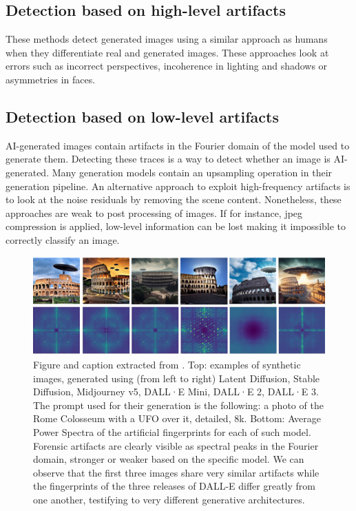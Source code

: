 \documentclass[12pt,a4paper]{article}
\begin{document}
\subsection{Detection based on high-level artifacts}
These methods detect generated images using a similar approach as humans when they differentiate real and generated images. These approaches look at errors such as incorrect perspectives, incoherence in lighting and shadows or asymmetries in faces.

\subsection{Detection based on low-level artifacts}
AI-generated images contain artifacts in the Fourier domain of the model used to generate them. Detecting these traces is a way to detect whether an image is AI-generated. Many generation models contain an upsampling operation in their generation pipeline. An alternative approach to exploit high-frequency artifacts is to look at the noise residuals by removing the scene content. Nonetheless, these approaches are weak to post processing of images. If for instance, jpeg compression is applied, low-level information can be lost making it impossible to correctly classify an image.
\begin{figure}[H]
    \includegraphics[width=\textwidth]{img/peaks.png}
    \caption{Figure and caption extracted from \autocite*{tariangSyntheticImageVerification2024}. Top: examples of synthetic images, generated using (from left to right) Latent Diffusion, Stable Diffusion, Midjourney v5, DALL·E Mini, DALL·E 2, DALL·E 3. The prompt used for their generation is the following: a photo of the Rome Colosseum with a UFO over it, detailed, 8k. Bottom: Average Power Spectra of the artificial fingerprints for each of such model. Forensic artifacts are clearly visible as spectral peaks in the Fourier domain, stronger or weaker based on the specific model. We can observe that the first three images share very similar artifacts while the fingerprints of the three releases of DALL-E differ greatly from one another, testifying to very different generative architectures.}
\end{figure}
\end{document}
